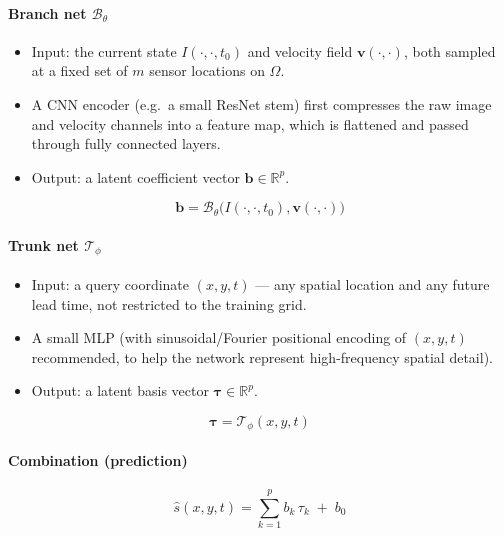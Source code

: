 \documentclass[11pt]{article}
\begin{document}
\paragraph{Branch net $\mathcal{B}_\theta$}
\begin{itemize}
    \item Input: the current state $I(\cdot,\cdot,t_0)$ and velocity field $\mathbf{v}(\cdot,\cdot)$, both sampled at a fixed set of $m$ sensor locations on $\Omega$.
    \item A CNN encoder (e.g.\ a small ResNet stem) first compresses the raw image and velocity channels into a feature map, which is flattened and passed through fully connected layers.
    \item Output: a latent coefficient vector $\mathbf{b} \in \mathbb{R}^p$.
\end{itemize}

\begin{equation}
\mathbf{b} = \mathcal{B}_\theta\big(I(\cdot,\cdot,t_0), \mathbf{v}(\cdot,\cdot)\big)
\end{equation}

\paragraph{Trunk net $\mathcal{T}_\phi$}
\begin{itemize}
    \item Input: a query coordinate $(x, y, t)$ --- any spatial location and any future lead time, not restricted to the training grid.
    \item A small MLP (with sinusoidal/Fourier positional encoding of $(x,y,t)$ recommended, to help the network represent high-frequency spatial detail).
    \item Output: a latent basis vector $\boldsymbol{\tau} \in \mathbb{R}^p$.
\end{itemize}

\begin{equation}
\boldsymbol{\tau} = \mathcal{T}_\phi(x, y, t)
\end{equation}

\paragraph{Combination (prediction)}

\begin{equation}
\hat{s}(x, y, t) = \sum_{k=1}^{p} b_k \, \tau_k \;+\; b_0
\end{equation}
\end{document}
